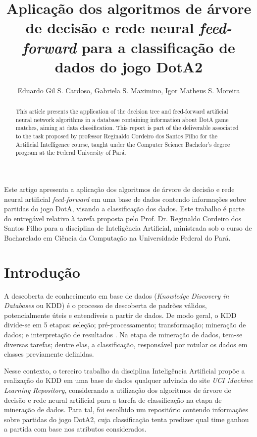 \documentclass[12pt]{article}
\title{Aplicação dos algoritmos de árvore de decisão e rede neural \textit{feed-forward} para a classificação de dados do jogo DotA2}
\author{Eduardo Gil S. Cardoso\inst{1}, Gabriela S. Maximino\inst{1}, Igor Matheus S. Moreira\inst{1}}
\begin{document}
 

\maketitle

\begin{abstract}
  This article presents the application of the decision tree and feed-forward artificial neural network algorithms in a database containing information about DotA game matches, aiming at data classification. This report is part of the deliverable associated to the task proposed by professor Reginaldo Cordeiro dos Santos Filho for the Artificial Intelligence course, taught under the Computer Science Bachelor’s degree program at the Federal University of Pará.
\end{abstract}
     
\begin{resumo} 
  Este artigo apresenta a aplicação dos algoritmos de árvore de decisão e rede neural artificial \textit{feed-forward} em uma base de dados contendo informações sobre partidas do jogo DotA, visando a classificação dos dados. Este trabalho é parte do entregável relativo à tarefa proposta pelo Prof. Dr. Reginaldo Cordeiro dos Santos Filho para a disciplina de Inteligência Artificial, ministrada sob o curso de Bacharelado em Ciência da Computação na Universidade Federal do Pará.
\end{resumo}


\section{Introdução}\label{sec:intro}
A descoberta de conhecimento em base de dados (\textit{Knowledge Discovery in Databases} ou KDD) é o processo de descoberta de padrões válidos, potencialmente úteis e entendíveis a partir de dados. De modo geral, o KDD divide-se em 5 etapas: seleção; pré-processamento; transformação; mineração de dados; e interpretação de resultados \cite{fayyad}. Na etapa de mineração de dados, tem-se diversas tarefas; dentre elas, a classificação, responsável por rotular os dados em classes previamente definidas.

Nesse contexto, o terceiro trabalho da disciplina Inteligência Artificial propõe a realização do KDD em uma base de dados qualquer advinda do site \textit{UCI Machine Learning Repository}, considerando a utilização dos algoritmos de árvore de decisão e rede neural artificial para a tarefa de classificação na etapa de mineração de dados. Para tal, foi escolhido um repositório contendo informações sobre partidas do jogo DotA2, cuja classificação tenta predizer qual time ganhou a partida com base nos atributos considerados.
\end{document}

